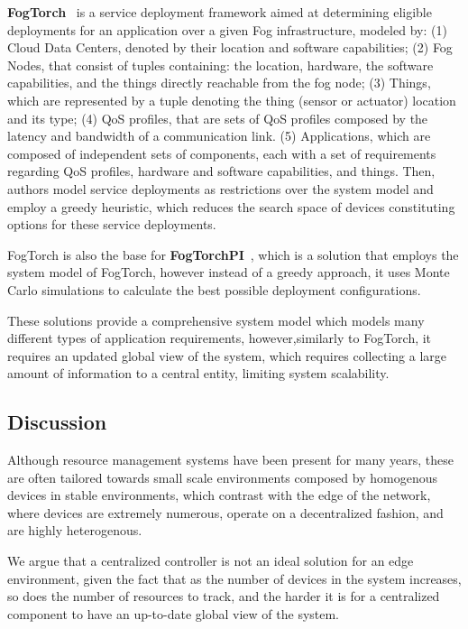 \textbf{FogTorch}~\cite{Brogi2017} is a service deployment framework aimed at determining eligible deployments for an application over a given Fog infrastructure, modeled by: (1) Cloud Data Centers, denoted by their location and software capabilities; (2) Fog Nodes, that consist of tuples containing: the location, hardware, the software capabilities, and the things directly reachable from the fog node; (3) Things, which are represented by a tuple denoting the thing (sensor or actuator) location and its type; (4) QoS profiles, that are sets of QoS profiles composed by the latency and bandwidth of a communication link. (5) Applications, which are composed of independent sets of components, each with a set of requirements regarding QoS profiles, hardware and software capabilities, and things. Then, authors model service deployments as restrictions over the system model and employ a greedy heuristic, which reduces the search space of devices constituting options for these service deployments.

FogTorch is also the base for \textbf{FogTorchPI}~\cite{brogi2017best}, which is a solution that employs the system model of FogTorch, however instead of a greedy approach, it uses Monte Carlo simulations to calculate the best possible deployment configurations.

These solutions provide a comprehensive system model which models many different types of application requirements, however,similarly to FogTorch, it requires an updated global view of the system, which requires collecting a large amount of information to a central entity, limiting system scalability.

\subsection{Discussion}

Although resource management systems have been present for many years, these are often tailored towards small scale environments composed by homogenous devices in stable environments, which contrast with the edge of the network, where devices are extremely numerous, operate on a decentralized fashion, and are highly heterogenous.

We argue that a centralized controller is not an ideal solution for an edge environment, given the fact that as the number of devices in the system increases, so does the number of resources to track, and the harder it is for a centralized component to have an up-to-date global view of the system.

